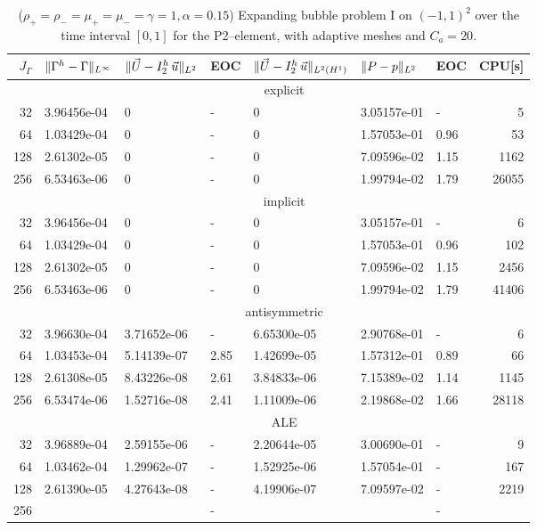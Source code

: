 \begin{table}
\center
\hspace*{-3.25cm}
\begin{tabular}{rllllllr}
\hline
$J_\Gamma$ & $\|\Gamma^h - \Gamma\|_{L^\infty}$ & $\|\vec U - I^h_{2}\,\vec u\|_{L^2}$ & EOC & $\|\vec U - I^h_{2}\,\vec u\|_{L^2(H^1)}$ & $\|P - p\|_{L^2}$ & EOC
& CPU[s] \\
\hline
& \multicolumn{7}{c}{explicit} \\
\hline
 32 & 3.96456e-04 & 0 & - & 0 & 3.05157e-01 &    - &     5 \\
 64 & 1.03429e-04 & 0 & - & 0 & 1.57053e-01 & 0.96 &    53 \\
128 & 2.61302e-05 & 0 & - & 0 & 7.09596e-02 & 1.15 &  1162 \\
256 & 6.53463e-06 & 0 & - & 0 & 1.99794e-02 & 1.79 & 26055 \\
\hline
& \multicolumn{7}{c}{implicit} \\
\hline
 32 & 3.96456e-04 & 0 & - & 0 & 3.05157e-01 &    - &     6 \\
 64 & 1.03429e-04 & 0 & - & 0 & 1.57053e-01 & 0.96 &   102 \\
128 & 2.61302e-05 & 0 & - & 0 & 7.09596e-02 & 1.15 &  2456 \\
256 & 6.53463e-06 & 0 & - & 0 & 1.99794e-02 & 1.79 & 41406 \\
\hline
& \multicolumn{7}{c}{antisymmetric} \\
\hline
 32 & 3.96630e-04 & 3.71652e-06 &    - & 6.65300e-05 & 2.90768e-01 &    - &
6 \\
 64 & 1.03453e-04 & 5.14139e-07 & 2.85 & 1.42699e-05 & 1.57312e-01 & 0.89 &
66 \\
128 & 2.61308e-05 & 8.43226e-08 & 2.61 & 3.84833e-06 & 7.15389e-02 & 1.14 &
1145 \\
256 & 6.53474e-06 & 1.52716e-08 & 2.41 & 1.11009e-06 & 2.19868e-02 & 1.66 &
28118 \\
\hline
& \multicolumn{7}{c}{ALE} \\
\hline
 32 & 3.96889e-04 & 2.59155e-06 & - & 2.20644e-05 & 3.00690e-01 & - &    9 \\
 64 & 1.03462e-04 & 1.29962e-07 & - & 1.52925e-06 & 1.57054e-01 & - &  167 \\
128 & 2.61390e-05 & 4.27643e-08 & - & 4.19906e-07 & 7.09597e-02 & - & 2219 \\
256 & & & - & & & - & \\
\hline
\end{tabular}
\hspace*{-3.25cm}
\caption[Navier--Stokes expanding bubble I errors P2--\pdg]
{($\rho_+ = \rho_- = \mu_+ = \mu_- = \gamma = 1,\alpha=0.15$)
Expanding bubble problem I on $(-1,1)^2$ over the time interval $[0,1]$ for the
P2--\pdg element, with adaptive meshes and $C_a=20$\textdegree.}
\label{tab:nsexpandingbubbleIp2p1dg}
\end{table}

